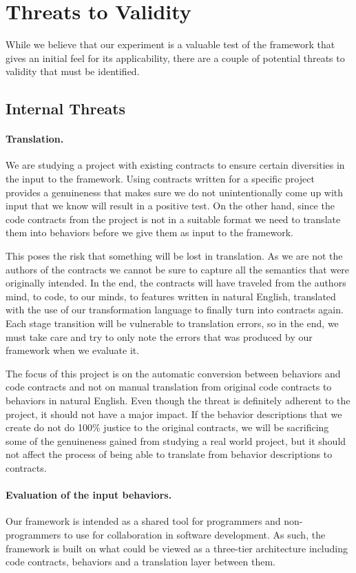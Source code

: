 \section{Threats to Validity}
While we believe that our experiment is a valuable test of the framework that gives an initial feel for its applicability, there are a couple of potential threats to validity that must be identified.

\subsection{Internal Threats}
\paragraph{Translation.}
We are studying a project with existing contracts to ensure certain diversities in the input to the framework.
Using contracts written for a specific project provides a genuineness that makes sure we do not unintentionally come up with input that we know will result in a positive test.
On the other hand, since the code contracts from the project is not in a suitable format we need to translate them into behaviors before we give them as input to the framework.
 
This poses the risk that something will be lost in translation.
As we are not the authors of the contracts we cannot be sure to capture all the semantics that were originally intended.
In the end, the contracts will have traveled from the authors mind, to code, to our minds, to features written in natural English, translated with the use of our transformation language to finally turn into contracts again.
Each stage transition will be vulnerable to translation errors, so in the end, we must take care and try to only note the errors that was produced by our framework when we evaluate it.
 
The focus of this project is on the automatic conversion between behaviors and code contracts and not on manual translation from original code contracts to behaviors in natural English. Even though the threat is definitely adherent to the project, it should not have a major impact.
If the behavior descriptions that we create do not do 100\%  justice to the original contracts, we will be sacrificing some of the genuineness gained from studying a real world project, but it should not affect the process of being able to translate from behavior descriptions to contracts.

\paragraph{Evaluation of the input behaviors.}
Our framework is intended as a shared tool for programmers and non-programmers to use for collaboration in software development.
As such, the framework is built on what could be viewed as a three-tier architecture including code contracts, behaviors and a translation layer between them.
 
